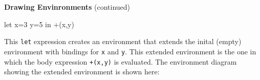 \begin{minipage}[t]{\sw}
\slidenumber
\LARGE
{\bf Drawing Envinronments} (continued)
\begin{qv}
let
  x=3
  y=5
in
  +(x,y)
\end{qv}
This \verb'let' expression creates an environment
that extends the inital (empty) environment
with bindings for \verb'x' and \verb'y'.
This extended environment is the one
in which the body expression \verb'+(x,y)' is evaluated.
The environment diagram showing the extended environment
is shown here:\exx
\centerline{}
\end{minipage}
